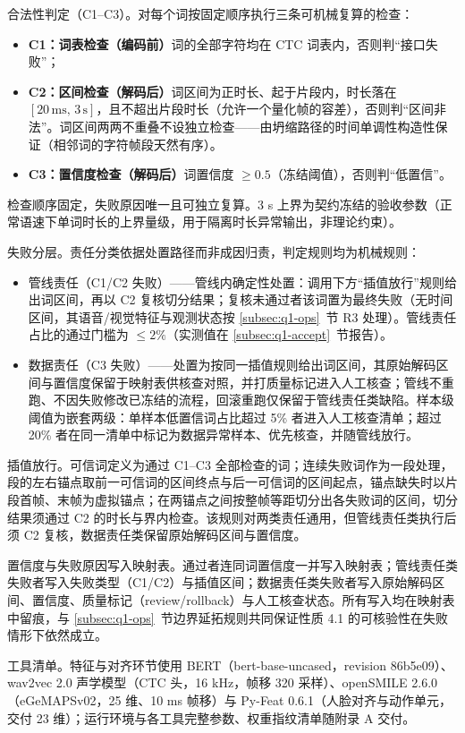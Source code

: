 \documentclass[colorprint,nocoverzero]{gmcmthesis}
\begin{document}
合法性判定（C1--C3）。对每个词按固定顺序执行三条可机械复算的检查：
\begin{itemize}
  \item \textbf{C1：词表检查（编码前）}词的全部字符均在 CTC 词表内，否则判``接口失败''；
  \item \textbf{C2：区间检查（解码后）}词区间为正时长、起于片段内，时长落在 $[20\,\mathrm{ms},\,3\,\mathrm{s}]$，且不超出片段时长（允许一个量化帧的容差），否则判``区间非法''。词区间两两不重叠不设独立检查——由坍缩路径的时间单调性构造性保证（相邻词的字符帧段天然有序）。
  \item \textbf{C3：置信度检查（解码后）}词置信度 $\ge 0.5$（冻结阈值），否则判``低置信''。
\end{itemize}
检查顺序固定，失败原因唯一且可独立复算。3 s 上界为契约冻结的验收参数（正常语速下单词时长的上界量级，用于隔离时长异常输出，非理论约束）。

失败分层。责任分类依据处置路径而非成因归责，判定规则均为机械规则：
\begin{itemize}
  \item 管线责任（C1/C2 失败）——管线内确定性处置：调用下方``插值放行''规则给出词区间，再以 C2 复核切分结果；复核未通过者该词置为最终失败（无时间区间，其语音/视觉特征与观测状态按 \ref{subsec:q1-ops}~节 R3 处理）。管线责任占比的通过门槛为 $\le 2\%$（实测值在 \ref{subsec:q1-accept}~节报告）。
  \item 数据责任（C3 失败）——处置为按同一插值规则给出词区间，其原始解码区间与置信度保留于映射表供核查对照，并打质量标记进入人工核查；管线不重跑、不因失败修改已冻结的流程，回滚重跑仅保留于管线责任类缺陷。样本级阈值为嵌套两级：单样本低置信词占比超过 5\% 者进入人工核查清单；超过 20\% 者在同一清单中标记为数据异常样本、优先核查，并随管线放行。
\end{itemize}

插值放行。可信词定义为通过 C1--C3 全部检查的词；连续失败词作为一段处理，段的左右锚点取前一可信词的区间终点与后一可信词的区间起点，锚点缺失时以片段首帧、末帧为虚拟锚点；在两锚点之间按整帧等距切分出各失败词的区间，切分结果须通过 C2 的时长与界内检查。该规则对两类责任通用，但管线责任类执行后须 C2 复核，数据责任类保留原始解码区间与置信度。

置信度与失败原因写入映射表。通过者连同词置信度一并写入映射表；管线责任类失败者写入失败类型（C1/C2）与插值区间；数据责任类失败者写入原始解码区间、置信度、质量标记（review/rollback）与人工核查状态。所有写入均在映射表中留痕，与 \ref{subsec:q1-ops}~节边界延拓规则共同保证性质 4.1 的可核验性在失败情形下依然成立。

工具清单。特征与对齐环节使用 BERT（bert-base-uncased，revision 86b5e09）\cite{devlin2019bert}、wav2vec 2.0 声学模型\cite{baevski2020wav2vec}（CTC 头，16 kHz，帧移 320 采样）、openSMILE 2.6.0（eGeMAPSv02，25 维、10 ms 帧移）与 Py-Feat 0.6.1\cite{cheong2023pyfeat}（人脸对齐与动作单元，交付 23 维）；运行环境与各工具完整参数、权重指纹清单随附录 A 交付。
\end{document}

